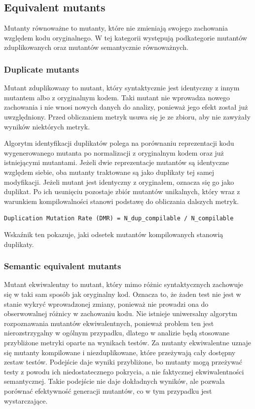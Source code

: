 \documentclass[12pt,a4paper,oldfontcommands]{memoir}
\theoremstyle{plain}
\theoremstyle{definition}
\theoremstyle{remark}
\begin{document}
    \subsection{Equivalent mutants}

    Mutanty równoważne to mutanty, które nie zmieniają swojego zachowania względem kodu oryginalnego. W tej kategorii występują podkategorie mutantów zduplikowanych oraz mutantów semantycznie równoważnych.

    \subsubsection{Duplicate mutants}

    Mutant zduplikowany to mutant, który syntaktycznie jest identyczny z innym mutantem albo z oryginalnym kodem. Taki mutant nie wprowadza nowego zachowania i nie wnosi nowych danych do analizy, ponieważ jego efekt został już uwzględniony. Przed obliczaniem metryk usuwa się je ze zbioru, aby nie zawyżały wyników niektórych metryk.

    Algorytm identyfikacji duplikatów polega na porównaniu reprezentacji kodu wygenerowanego mutanta po normalizacji z oryginalnym kodem oraz już istniejącymi mutantami.
    Jeżeli dwie reprezentacje mutantów są identyczne względem siebie, oba mutanty traktowane są jako duplikaty tej samej modyfikacji.
    Jeżeli mutant jest identyczny z oryginałem, oznacza się go jako duplikat.
    Po ich usunięciu pozostaje zbiór mutantów unikalnych, który wraz z warunkiem kompilowalności stanowi podstawę do obliczania dalszych metryk.

    \begin{center}
        \texttt{Duplication Mutation Rate (DMR) = N\_dup\_compilable / N\_compilable}
    \end{center}

    Wskaźnik ten pokazuje, jaki odsetek mutantów kompilowanych stanowią duplikaty.

    \subsubsection{Semantic equivalent mutants}

    Mutant ekwiwalentny to mutant, który mimo różnic syntaktycznych zachowuje się w taki sam sposób jak oryginalny kod.
    Oznacza to, że żaden test nie jest w stanie wykryć wprowadzonej zmiany, ponieważ nie prowadzi ona do obserwowalnej różnicy w zachowaniu kodu.
    Nie istnieje uniwersalny algorytm rozpoznawania mutantów ekwiwalentnych, ponieważ problem ten jest nierozstrzygalny w ogólnym przypadku, dlatego w analizie będą stosowane przybliżone metryki oparte na wynikach testów.
    Za mutanty ekwiwalentne uznaje się mutanty kompilowane i niezduplikowane, które przeżywają cały dostępny zestaw testów.
    Podejście daje wyniki przybliżone, bo mutanty mogą przeżywać testy z powodu ich niedostatecznego pokrycia, a nie faktycznej ekwiwalentności semantycznej.
    Takie podejście nie daje dokładnych wyników, ale pozwala porównać efektywność generacji mutantów, co w tym przypadku jest wystarczające.
\end{document}
